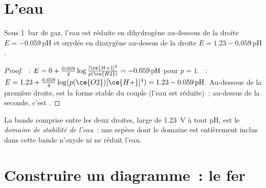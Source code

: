 \section{L'eau}

\begin{proposition}\label{prop:b1:e-ph-diagrams:water-lines}
Sous \qty{1}{bar} de gaz, l'eau est réduite en dihydrogène au-dessous de
la droite
$E = -0.059\,\mathrm{pH}$ et oxydée en dioxygène au-dessus de la droite $E = 1.23
- 0.059\,\mathrm{pH}$.
\end{proposition}

\begin{proof}
~: $E = 0 + \frac{0.059}{2}\log\frac{[\ce{H+}]^2}{p(\ce{H2})}
= -0.059\,\mathrm{pH}$ pour $p = 1$. ~: $E = 1.23 +
\frac{0.059}{4}\log(p(\ce{O2})[\ce{H+}]^4) = 1.23 - 0.059\,\mathrm{pH}$.
Au-dessous de la première droite,  est la forme stable du couple
(l'eau est réduite)~; au-dessus de la seconde, c'est .
\end{proof}

\begin{definition}\label{def:b1:e-ph-diagrams:water-domain}
La bande comprise entre les deux droites, large de \qty{1.23}{V} à tout
pH, est le \emph{domaine de stabilité de l'eau}~: une
espèce dont le domaine est entièrement inclus dans cette bande n'oxyde
ni ne réduit l'eau.
\end{definition}

\section{Construire un diagramme~: le fer}


